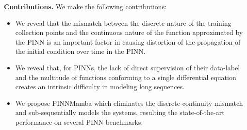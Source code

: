 \textbf{Contributions.} We make the following contributions:
\vspace{-2mm}
\begin{itemize}
    \item We reveal that the mismatch between the discrete nature of the training collection points and the continuous nature of the function approximated by the PINN is an important factor in causing distortion of the propagation of the initial condition over time in the PINN.
    \item We reveal that, for PINNs, the lack of direct supervision of their data-label and the multitude of functions conforming to a single differential equation creates an intrinsic difficulty in modeling long sequences.
    \item We propose PINNMamba which eliminates the discrete-continuity mismatch and sub-sequentially models the systems, resulting the state-of-the-art performance on several PINN benchmarks.
\end{itemize}


    




